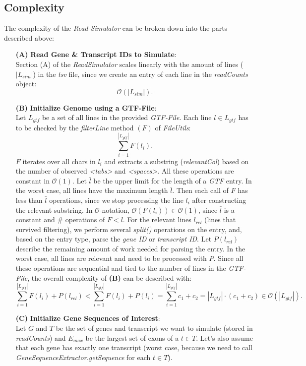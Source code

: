 \documentclass[12pt]{article}
\begin{document}
\subsection{Complexity}
The complexity of the \textit{Read Simulator} can be broken down into the parts described above:
\begin{enumerate}
	\item[\textbf{(A)}] \textbf{Read Gene \& Transcript IDs to Simulate}:\\
		Section (A) of the \textit{ReadSimulator} scales linearly with the amount of lines ($|L_{sim}|$) in the \textit{tsv} file, since
		we create an entry of each line in the \textit{readCounts} object:
		\[
			\mathcal{O}(|L_{sim}|)
			.\]
	\item[\textbf{(B)}] \textbf{Initialize Genome using a GTF-File}:\\
		Let $L_{gtf}$ be a set of all lines in the provided \textit{GTF-File}.
		Each line $l \in L_{gtf}$ has to be checked by the \textit{filterLine} method $(F)$ of \textit{FileUtils}:
		\[
			\sum_{i=1}^{|L_{gtf}|} F(l_{i})
			.\]
		$F$ iterates over all chars in $l_{i}$ and extracts a substring (\textit{relevantCol}) based on the number
		of observed \textit{<tabs>} and \textit{<spaces>}. All these operations are constant in $\mathcal{O}(1)$.
		Let $\bar{l}$ be the upper limit for the length of a \textit{GTF} entry. In the worst case, all lines
		have the maximum length $\bar{l}$. Then each call of $F$ has less than $\bar{l}$ operations, since we
		stop processing the line $l_{i}$ after constructing the relevant substring. In $\mathcal{O}$-notation,
		$\mathcal{O}(F(l_{i})) \in \mathcal{O}(1)$, since $\bar{l}$ is a constant and $\#$ operations of $F < \bar{l}$.
		For the relevant lines $l_{rel}$ (lines that survived filtering), we perform several
		\textit{split()} operations on the entry, and, based on the entry type, parse the \textit{gene ID}
		or \textit{transcript ID}. Let $P(l_{rel})$ describe the remaining amount of work needed
		for parsing the entry. In the worst case, all lines are relevant and need to be processed with $P$.
		Since all these operations are sequential and tied to the number of lines in the \textit{GTF-File}, the overall complexity of \textbf{(B)} can be
		described with:
		\[
			\sum_{i=1}^{|L_{gtf}|} F(l_{i}) + P(l_{rel}) < \sum_{i=1}^{|L_{gtf}|} F(l_{i}) + P(l_{i}) = \sum_{i=1}^{|L_{gtf}|} c_{1} + c_{2} = |L_{gtf}| \cdot (c_{1} + c_{2}) \in \mathcal{O}(|L_{gtf}|)
			.\]
		\newpage
	\item[\textbf{(C)}] \textbf{Initialize Gene Sequences of Interest}:\label{initTargetSequences}\\
		Let $G$ and $T$ be the set of genes and transcript we want to simulate (stored in \textit{readCounts}) and $E_{max}$ be the largest set of exons of a $t \in T$.
		Let's also assume that each gene has exactly one transcript (worst case, because we need to call \textit{GeneSequenceExtractor.getSequence} for each $t \in T$).


\end{enumerate}
\end{document}
